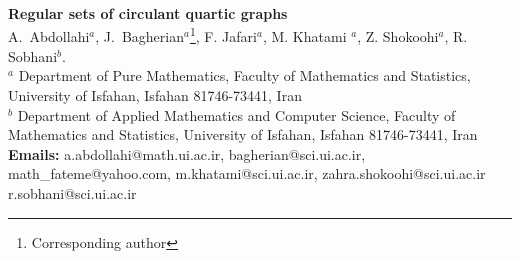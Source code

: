 \documentclass[12pt]{article}
\begin{document}
\baselineskip=18pt
\date{}
\begin{center}
{\bf\Large Regular sets of circulant quartic graphs }
\\ \vspace{1cm}
{\small  A.~Abdollahi$^{a}$, J.~Bagherian$^a${\footnote{Corresponding author}}, F. Jafari$^{a}$, M. Khatami $^{a}$, Z. Shokoohi$^{a}$, R. Sobhani$^{b}$.}
 \vspace{.5cm}
\\
{\small $^a$ Department of Pure Mathematics, Faculty of Mathematics and Statistics, University of Isfahan, Isfahan 81746-73441, Iran}\\
\vspace{-0.1cm}
{\small $^b$ Department of Applied Mathematics and Computer Science, Faculty of Mathematics and Statistics, University of Isfahan, Isfahan 81746-73441, Iran}\\
{\small {\bf Emails:} a.abdollahi@math.ui.ac.ir, bagherian@sci.ui.ac.ir, math\_fateme@yahoo.com, m.khatami@sci.ui.ac.ir, zahra.shokoohi@sci.ui.ac.ir  r.sobhani@sci.ui.ac.ir   }
\vspace{1.5cm}
\end{center}





\begin{abstract}
For a graph $\Gamma=(V,E)$ and nonnegative integers $a$ and $b$, a nonempty proper subset $C \subset V$ is called an $(a,b)$-regular set if every vertex in $C$ has exactly $a$ neighbors in $C$, and every vertex in $V\setminus C$ has exactly $b$ neighbors in $C$.
In this paper, we study the existence of such sets in connected Cayley graph $\Gamma = \operatorname{Cay}(\mathbb{Z}_n, S)$. 
We establish a necessary and sufficient condition for the existence of $(0, |S|)$-regular sets and identify additional conditions 
under which no such set can exist. We further prove that $(|S|, 0)$-regular sets do not occur in $\Gamma$, and more generally, that no 
connected  Cayley graph $\operatorname{Cay}(G,S)$ contains a $(1, |S|)$-regular set. As a main result, 
we determine the existence and nonexistence of $(a,b)$-regular sets in connected circulant quartic graphs for all possible values of $a$ and $b$.
\\\\
\noindent
{\small {\bf Keywords:} Regular set, Circulant graph, Perfect code, Total perfect code. }
\noindent
\end{abstract}
\end{document}
